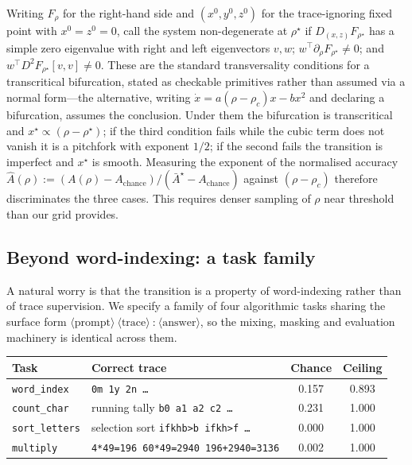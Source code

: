 \documentclass{article}
\theoremstyle{plain}
\theoremstyle{definition}
\theoremstyle{remark}
\newcommand{\1}{\mathbf{1}}
\begin{document}
Writing $F_\rho$ for the right-hand side and $(x^0,y^0,z^0)$ for the
trace-ignoring fixed point with $x^0 = z^0 = 0$, call the system non-degenerate
at $\rho^\star$ if $D_{(x,z)}F_{\rho^\star}$ has a simple zero eigenvalue with
right and left eigenvectors $v,w$; $w^\top\partial_\rho F_{\rho^\star}\ne0$; and
$w^\top D^2F_{\rho^\star}[v,v]\ne0$. These are the standard transversality
conditions for a transcritical bifurcation, stated as checkable primitives rather
than assumed via a normal form---the alternative, writing
$\dot x = a(\rho-\rho_c)x-bx^2$ and declaring a bifurcation, assumes the
conclusion. Under them the bifurcation is transcritical and
$x^\star\propto(\rho-\rho^\star)$; if the third condition fails while the cubic
term does not vanish it is a pitchfork with exponent $1/2$; if the second fails
the transition is imperfect and $x^\star$ is smooth. Measuring the exponent of
the normalised accuracy
$\widehat A(\rho) :=
(A(\rho)-A_{\mathrm{chance}})/(\bar A^\star-A_{\mathrm{chance}})$
against $(\rho-\rho_c)$ therefore discriminates the three cases. This requires
denser sampling of $\rho$ near threshold than our grid provides.

\subsection{Beyond word-indexing: a task family}
\label{app:family}

A natural worry is that the transition is a property of word-indexing rather than
of trace supervision. We specify a family of four algorithmic tasks sharing the
surface form $\langle\text{prompt}\rangle\ \langle\text{trace}\rangle\
\texttt{:}\ \langle\text{answer}\rangle$, so the mixing, masking and evaluation
machinery is identical across them.

\begin{center}
\small
\begin{tabular}{llcc}
\toprule
Task & Correct trace & Chance & Ceiling \\
\midrule
\texttt{word\_index} & \texttt{0m 1y 2n \dots} & 0.157 & 0.893 \\
\texttt{count\_char} & running tally \texttt{b0 a1 a2 c2 \dots} & 0.231 & 1.000 \\
\texttt{sort\_letters} & selection sort \texttt{ifkhb>b ifkh>f \dots} & 0.000 & 1.000 \\
\texttt{multiply} & \texttt{4*49=196 60*49=2940 196+2940=3136} & 0.002 & 1.000 \\
\bottomrule
\end{tabular}
\end{center}
\end{document}
